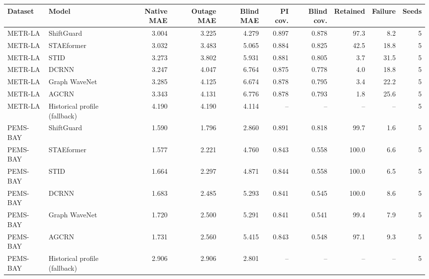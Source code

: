 \begin{tabular}{llrrrrrrrr}
\toprule
Dataset & Model & Native MAE & Outage MAE & Blind MAE & PI cov. & Blind cov. & Retained & Failure & Seeds \\
\midrule
METR-LA & ShiftGuard & 3.004 & 3.225 & 4.279 & 0.897 & 0.878 & 97.3 & 8.2 & 5 \\
METR-LA & STAEformer & 3.032 & 3.483 & 5.065 & 0.884 & 0.825 & 42.5 & 18.8 & 5 \\
METR-LA & STID & 3.273 & 3.802 & 5.931 & 0.881 & 0.805 & 3.7 & 31.5 & 5 \\
METR-LA & DCRNN & 3.247 & 4.047 & 6.764 & 0.875 & 0.778 & 4.0 & 18.8 & 5 \\
METR-LA & Graph WaveNet & 3.285 & 4.125 & 6.674 & 0.878 & 0.795 & 3.4 & 22.2 & 5 \\
METR-LA & AGCRN & 3.343 & 4.131 & 6.776 & 0.878 & 0.793 & 1.8 & 25.6 & 5 \\
METR-LA & Historical profile (fallback) & 4.190 & 4.190 & 4.114 & -- & -- & -- & -- & 5 \\
PEMS-BAY & ShiftGuard & 1.590 & 1.796 & 2.860 & 0.891 & 0.818 & 99.7 & 1.6 & 5 \\
PEMS-BAY & STAEformer & 1.577 & 2.221 & 4.760 & 0.843 & 0.558 & 100.0 & 6.6 & 5 \\
PEMS-BAY & STID & 1.664 & 2.297 & 4.871 & 0.844 & 0.558 & 100.0 & 6.5 & 5 \\
PEMS-BAY & DCRNN & 1.683 & 2.485 & 5.293 & 0.841 & 0.545 & 100.0 & 8.6 & 5 \\
PEMS-BAY & Graph WaveNet & 1.720 & 2.500 & 5.291 & 0.841 & 0.541 & 99.4 & 7.9 & 5 \\
PEMS-BAY & AGCRN & 1.731 & 2.560 & 5.415 & 0.843 & 0.548 & 97.1 & 9.3 & 5 \\
PEMS-BAY & Historical profile (fallback) & 2.906 & 2.906 & 2.801 & -- & -- & -- & -- & 5 \\
\bottomrule
\end{tabular}
